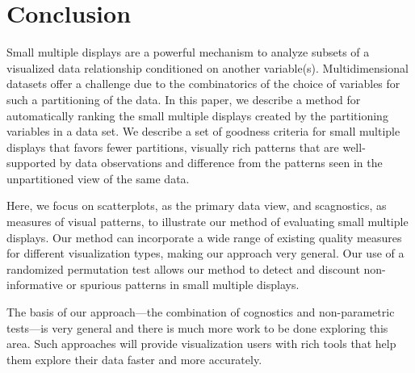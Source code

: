 \section{Conclusion}

Small multiple displays are a powerful mechanism to analyze subsets of a visualized data relationship conditioned on another variable(s). Multidimensional datasets offer a challenge due to the combinatorics of the choice of variables for such a partitioning of the data. In this paper, we describe a method for automatically ranking the small multiple displays created by the partitioning variables in a data set. We describe a set of goodness criteria for small multiple displays that favors fewer partitions, visually rich patterns that are well-supported by data observations and difference from the patterns seen in the unpartitioned view of the same data.

Here, we focus on scatterplots, as the primary data view, and scagnostics, as measures of visual patterns, to illustrate our method of evaluating small multiple displays. Our method can incorporate a wide range of existing quality measures for different visualization types, making our approach very general. Our use of a randomized permutation test allows our method to detect and discount non-informative or spurious patterns in small multiple displays.

The basis of our approach---the combination of cognostics and non-parametric tests---is very general and there is much more work to be done exploring this area. Such approaches will provide visualization users with rich tools that help them explore their data faster and more accurately.
